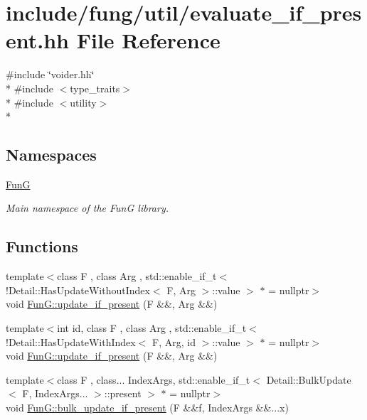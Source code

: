 \hypertarget{evaluate__if__present_8hh}{}\section{include/fung/util/evaluate\+\_\+if\+\_\+present.hh File Reference}
\label{evaluate__if__present_8hh}
{\ttfamily \#include \char`\"{}voider.\+hh\char`\"{}}\\*
{\ttfamily \#include $<$type\+\_\+traits$>$}\\*
{\ttfamily \#include $<$utility$>$}\\*
\subsection*{Namespaces}
\begin{DoxyCompactItemize}
\item 
 \hyperlink{namespaceFunG}{FunG}
\begin{DoxyCompactList}\small\item\em Main namespace of the FunG library. \end{DoxyCompactList}\end{DoxyCompactItemize}
\subsection*{Functions}
\begin{DoxyCompactItemize}
\item 
{\footnotesize template$<$class F , class Arg , std\+::enable\+\_\+if\+\_\+t$<$ !\+Detail\+::\+Has\+Update\+Without\+Index$<$ F, Arg $>$\+::value $>$ $\ast$  = nullptr$>$ }\\void \hyperlink{namespaceFunG_a3b9d2e5d07b30c2ee26703b33e9adb9e}{Fun\+G\+::update\+\_\+if\+\_\+present} (F \&\&, Arg \&\&)
\item 
{\footnotesize template$<$int id, class F , class Arg , std\+::enable\+\_\+if\+\_\+t$<$ !\+Detail\+::\+Has\+Update\+With\+Index$<$ F, Arg, id $>$\+::value $>$ $\ast$  = nullptr$>$ }\\void \hyperlink{namespaceFunG_aed5ddbef97c98202e818bca2b74c75d2}{Fun\+G\+::update\+\_\+if\+\_\+present} (F \&\&, Arg \&\&)
\item 
{\footnotesize template$<$class F , class... Index\+Args, std\+::enable\+\_\+if\+\_\+t$<$ Detail\+::\+Bulk\+Update$<$ F, Index\+Args... $>$\+::present $>$ $\ast$  = nullptr$>$ }\\void \hyperlink{namespaceFunG_a3a871f854db9e381d7a09724924971dc}{Fun\+G\+::bulk\+\_\+update\+\_\+if\+\_\+present} (F \&\&f, Index\+Args \&\&...x)
\end{DoxyCompactItemize}
